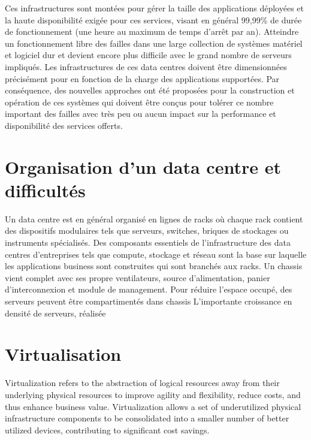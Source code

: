 Ces infrastructures sont montées pour gérer la taille des applications déployées et la haute disponibilité exigée pour ces services, visant en général 99,99\% de durée de fonctionnement (une heure au maximum de temps d'arrêt par an). Atteindre un fonctionnement libre des failles dans une large collection de systèmes matériel et logiciel dur et devient encore plus difficile avec le grand nombre de serveurs impliqués. Les infrastructures de ces data centres doivent être dimensionnées précisément pour en fonction de la charge des applications supportées. Par conséquence, des nouvelles approches ont été proposées pour la construction et opération de ces systèmes qui doivent être conçus pour tolérer ce nombre important des failles avec très peu ou aucun impact sur la performance et disponibilité des services offerts. \cite{datacenterAsComputerIntro}

\section{Organisation d'un data centre et difficultés}

Un data centre est en général organisé en lignes de racks où chaque rack contient des dispositifs modulaires tels que serveurs, switches, briques de stockages ou instruments spécialisés. %
Des composants essentiels de l'infrastructure des data centres d'entreprises tels que compute, stockage et réseau sont la base sur laquelle les applications business sont construites qui sont branchés aux racks. Un chassis vient complet avec ses propre ventilateurs, source d'alimentation, panier d'interconnexion et module de management. 
Pour réduire l'espace occupé, des serveurs peuvent être compartimentés dans chassis  L'importante croissance en densité de serveurs, réalisée 

\section{Virtualisation}

Virtualization refers to the abstraction of logical resources away from their underlying physical resources to improve agility and flexibility, reduce costs, and thus enhance business value. Virtualization allows a set of underutilized physical infrastructure components to be consolidated into a smaller number of better utilized devices, contributing to significant cost savings.

